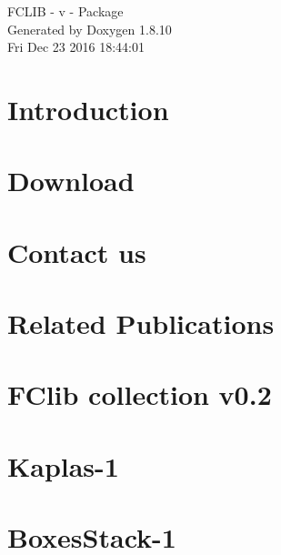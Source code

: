 \documentclass[twoside]{article}
\newcommand{\+}{\discretionary{\mbox{\scriptsize$\hookleftarrow$}}{}{}}
\begin{document}
\hypersetup{pageanchor=false,
             bookmarks=true,
             bookmarksnumbered=true,
             pdfencoding=unicode
            }
\begin{titlepage}
\vspace*{7cm}
\begin{center}%
{\Large F\+C\+L\+I\+B -\/ v -\/ Package }\\
\vspace*{1cm}
{\large Generated by Doxygen 1.8.10}\\
\vspace*{0.5cm}
{\small Fri Dec 23 2016 18:44:01}\\
\end{center}
\end{titlepage}
\tableofcontents
{}
\hypersetup{pageanchor=true}

\section{Introduction}
\label{index}\hypertarget{index}{}
\section{Download}
\label{download}
\hypertarget{download}{}

\section{Contact us}
\label{contact}
\hypertarget{contact}{}

\section{Related Publications}
\label{publications}
\hypertarget{publications}{}

\section{F\+Clib collection v0.2}
\label{problems_0_2}
\hypertarget{problems_0_2}{}

\section{Kaplas-\/1}
\label{kaplas1}
\hypertarget{kaplas1}{}

\section{Boxes\+Stack-\/1}
\label{boxesstack1}
\hypertarget{boxesstack1}{}

\end{document}
